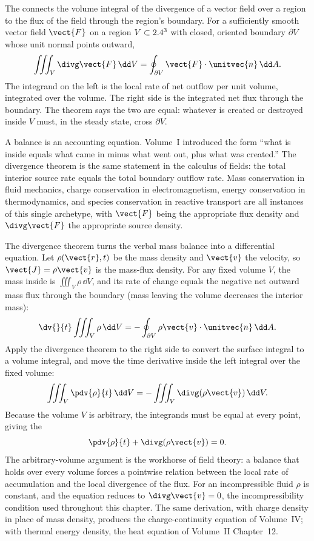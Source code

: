The  connects the volume integral of the
divergence of a vector field over a region to the flux of the field
through the region's boundary. For a sufficiently smooth vector field
$\vect{F}$ on a region $V \subset 2.4^{3}$ with closed, oriented
boundary $\partial V$ whose unit normal points outward,
\[
\iiint_{V} \divg\vect{F} \,\dd V =
\oint_{\partial V} \vect{F} \cdot \unitvec{n} \,\dd A.
\]
The integrand on the left is the local rate of net outflow per unit
volume, integrated over the volume. The right side is the integrated
net flux through the boundary. The theorem says the two are equal:
whatever is created or destroyed inside $V$ must, in the steady
state, cross $\partial V$.

\begin{archetype}
A balance is an accounting equation. Volume~I introduced the form
``what is inside equals what came in minus what went out, plus what
was created.'' The divergence theorem is the same statement in the
calculus of fields: the total interior source rate equals the total
boundary outflow rate. Mass conservation in fluid mechanics, charge
conservation in electromagnetism, energy conservation in
thermodynamics, and species conservation in reactive transport are
all instances of this single archetype, with $\vect{F}$ being the
appropriate flux density and $\divg\vect{F}$ the appropriate source
density.
\end{archetype}

\begin{example}
The divergence theorem turns the verbal mass balance into a
differential equation. Let $\rho(\vect{r}, t)$ be the mass density and
$\vect{v}$ the velocity, so $\vect{J} = \rho\vect{v}$ is the mass-flux
density. For any fixed volume $V$, the mass inside is $\iiint_{V}\rho
\,\dd V$, and its rate of change equals the negative net outward mass
flux through the boundary (mass leaving the volume decreases the
interior mass):
\[
\dv{}{t}\iiint_{V}\rho\,\dd V = -\oint_{\partial V}\rho\vect{v}\cdot
\unitvec{n}\,\dd A.
\]
Apply the divergence theorem to the right side to convert the surface
integral to a volume integral, and move the time derivative inside the
left integral over the fixed volume:
\[
\iiint_{V}\pdv{\rho}{t}\,\dd V = -\iiint_{V}\divg(\rho\vect{v})\,\dd V.
\]
Because the volume $V$ is arbitrary, the integrands must be equal at
every point, giving the 
\[
\pdv{\rho}{t} + \divg(\rho\vect{v}) = 0.
\]
The arbitrary-volume argument is the workhorse of field theory: a
balance that holds over every volume forces a pointwise relation
between the local rate of accumulation and the local divergence of the
flux. For an incompressible fluid $\rho$ is constant, and the equation
reduces to $\divg\vect{v} = 0$, the incompressibility condition used
throughout this chapter. The same derivation, with charge density in
place of mass density, produces the charge-continuity equation of
Volume~IV; with thermal energy density, the heat equation of
Volume~II Chapter~12.
\end{example}

